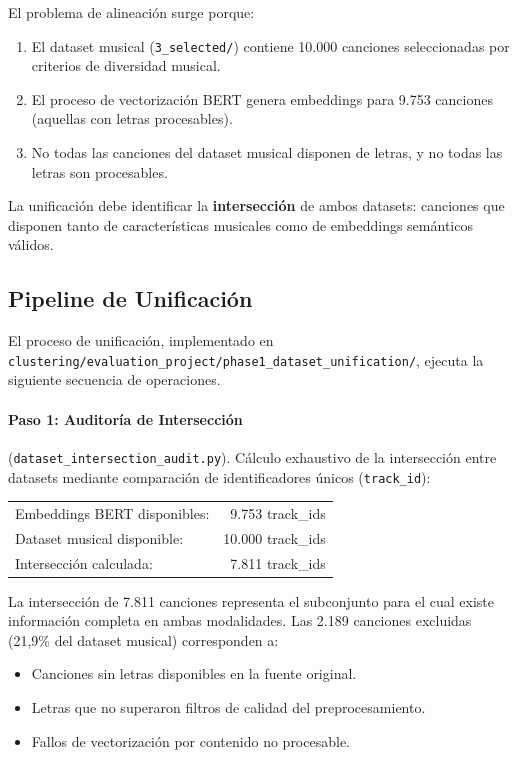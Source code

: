 El problema de alineación surge porque:
\begin{enumerate}
    \item El dataset musical (\texttt{3\_selected/}) contiene 10.000 canciones seleccionadas por criterios de diversidad musical.
    \item El proceso de vectorización BERT genera embeddings para 9.753 canciones (aquellas con letras procesables).
    \item No todas las canciones del dataset musical disponen de letras, y no todas las letras son procesables.
\end{enumerate}

La unificación debe identificar la \textbf{intersección} de ambos datasets: canciones que disponen tanto de características musicales como de embeddings semánticos válidos.

\subsection{Pipeline de Unificación}
\label{subsec:pipeline-unificacion}

El proceso de unificación, implementado en \texttt{clustering/evaluation\_project/phase1\_dataset\_unification/}, ejecuta la siguiente secuencia de operaciones.

\paragraph{Paso 1: Auditoría de Intersección} (\texttt{dataset\_intersection\_audit.py}).
Cálculo exhaustivo de la intersección entre datasets mediante comparación de identificadores únicos (\texttt{track\_id}):

\begin{center}
\begin{tabular}{lr}
Embeddings BERT disponibles: & 9.753 track\_ids \\
Dataset musical disponible: & 10.000 track\_ids \\
Intersección calculada: & 7.811 track\_ids \\
\end{tabular}
\end{center}

La intersección de 7.811 canciones representa el subconjunto para el cual existe información completa en ambas modalidades. Las 2.189 canciones excluidas (21,9\% del dataset musical) corresponden a:
\begin{itemize}
    \item Canciones sin letras disponibles en la fuente original.
    \item Letras que no superaron filtros de calidad del preprocesamiento.
    \item Fallos de vectorización por contenido no procesable.
\end{itemize}

